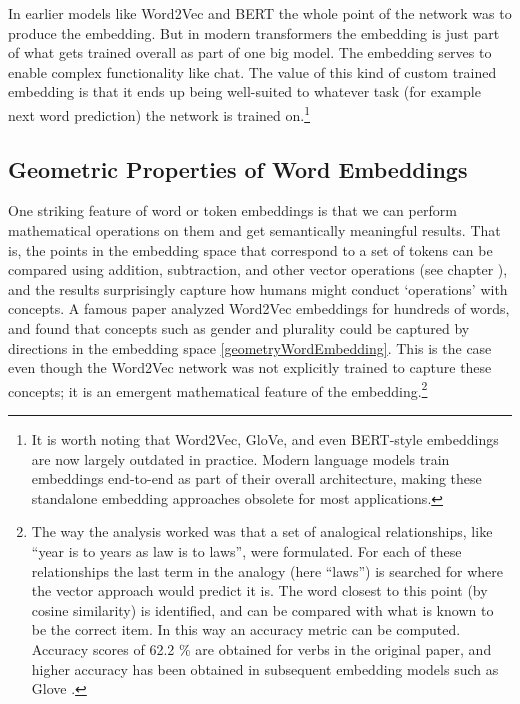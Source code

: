 In earlier models like Word2Vec and BERT the whole point of the network was to produce the embedding. But in modern transformers the embedding is just part of what gets trained overall as part of one big model. The embedding serves to enable complex functionality like chat. The value of this kind of custom trained embedding is that it ends up being well-suited to whatever task (for example next word prediction) the network is trained on.\footnote{It is worth noting that Word2Vec, GloVe, and even BERT-style embeddings are now largely outdated in practice. Modern language models train embeddings end-to-end as part of their overall architecture, making these standalone embedding approaches obsolete for most applications.}

\subsection{Geometric Properties of Word Embeddings}\label{geometryWordEmbeddings}

One striking feature of word or token embeddings is that we can perform mathematical operations on them and get semantically meaningful results. That is, the points in the embedding space that correspond to a set of tokens can be compared using addition, subtraction, and other vector operations (see chapter ), and the results surprisingly capture how humans might conduct `operations' with concepts.  A famous paper \cite{mikolov2013linguistic} analyzed Word2Vec embeddings for hundreds of words, and found that concepts such as gender and plurality could be captured by directions in the embedding space \ref{geometryWordEmbedding}. This is the case even though the Word2Vec network was not explicitly trained to capture these concepts; it is an emergent mathematical feature of the embedding.\footnote{The way the analysis worked was that a set of analogical relationships, like ``year is to years as law is to laws'', were formulated.  For each of these relationships the last term in the analogy (here ``laws'') is searched for where the vector approach would predict it is. The word closest to this point (by cosine similarity) is identified, and can be compared with what is known to be the correct item. In this way an accuracy metric can be computed.  Accuracy scores of 62.2 \% are obtained for verbs in the original paper, and higher accuracy has been obtained in subsequent embedding models such as Glove \cite{pennington2014glove}.}

